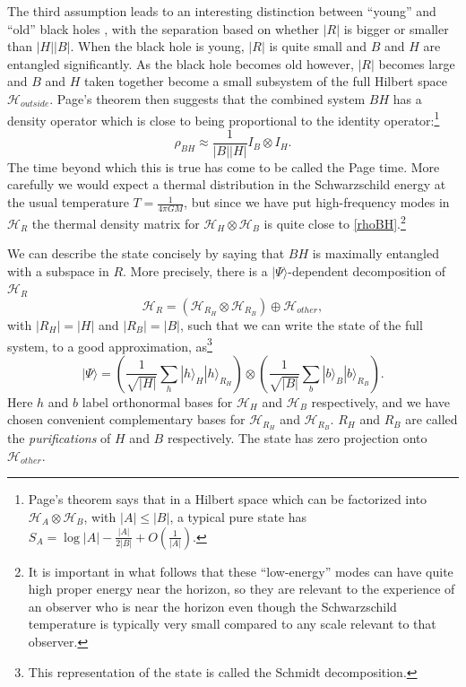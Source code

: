 \documentclass[12pt]{article}
\newcommand{\be}{\begin{equation}}
\newcommand{\ee}{\end{equation}}
\newcommand{\HH}{\mathcal{H}_H}
\newcommand{\HB}{\mathcal{H}_B}
\newcommand{\HR}{\mathcal{H}_R}
\newcommand{\HRB}{\mathcal{H}_{R_B}}
\newcommand{\HRH}{\mathcal{H}_{R_H}}
\newcommand{\ran}{\rangle}
\begin{document}
The third assumption leads to an interesting distinction between ``young'' and ``old'' black holes \cite{HaydenPreskill}, with the separation based on whether $|R|$ is bigger or smaller than $|H||B|$.   When the black hole is young, $|R|$ is quite small and $B$ and $H$ are entangled significantly.  As the black hole becomes old however, $|R|$ becomes large and $B$ and $H$ taken together become a small subsystem of the full Hilbert space $\mathcal{H}_{outside}$.  Page's theorem \cite{pagethm} then suggests that the combined system $BH$ has a density operator which is close to being proportional to the identity operator:\footnote{Page's theorem says that in a Hilbert space which can be factorized into $\mathcal{H}_A\otimes \mathcal{H}_B$, with $|A|\leq|B|$, a typical pure state has $S_A=\log|A|-\frac{|A|}{2|B|}+O\left(\frac{1}{|A|}\right)$.}
%
\be\label{rhoBH}
\rho_{BH}\approx \frac{1}{|B||H|}I_B\otimes I_H.
\ee  
The time beyond which this is true has come to be called the Page time.  More carefully we would expect a thermal distribution in the Schwarzschild energy at the usual temperature $T=\frac{1}{4\pi G M}$, but since we have put high-frequency modes in $\HR$ the thermal density matrix for $\HH\otimes\HB$ is quite close to \eqref{rhoBH}.\footnote{%
It is important in what follows that these ``low-energy'' modes can have quite high proper energy near the horizon, so they are relevant to the experience of an observer who is near the horizon even though the Schwarzschild temperature is typically very small compared to any scale relevant to that observer.}  

We can describe the state concisely by saying that $BH$ is maximally entangled with a subspace in $R$.  More precisely, there is a $|\Psi\ran$-dependent decomposition of $\HR$
\be
\HR=\left(\HRH\otimes\HRB\right)\oplus \mathcal{H}_{other},
\ee
with $|R_H|=|H|$ and $|R_B|=|B|$, such that we can write the state of the full system, to a good approximation, as\footnote{This representation of the state is called the Schmidt decomposition.}
\be\label{Psi}
|\Psi\ran=\left(\frac{1}{\sqrt{|H|}}\sum_h|h\ran_H |h\ran_{R_H}\right)\otimes \left(\frac{1}{\sqrt{|B|}}\sum_b|b\ran_B |b\ran_{R_B}\right).
\ee
Here $h$ and $b$ label orthonormal bases for $\HH$ and $\HB$ respectively, and we have chosen convenient complementary bases for $\HRH$ and $\HRB$.  $R_H$ and $R_B$ are called the \textit{purifications} of $H$ and $B$ respectively.  The state has zero projection onto $\mathcal{H}_{other}$.  
\end{document}
